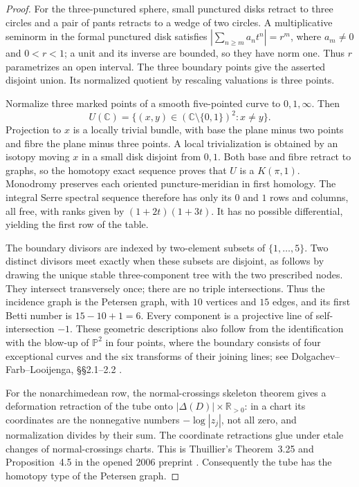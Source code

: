 \begin{proof}
For the three-punctured sphere, small punctured disks retract to three
circles and a pair of pants retracts to a wedge of two circles. A
multiplicative seminorm in the formal punctured disk satisfies
$|\sum_{n\geq m}a_nt^n|=r^m$, where $a_m\ne0$ and $0<r<1$; a unit and
its inverse are bounded, so they have norm one. Thus $r$ parametrizes an
open interval. The three boundary points give the asserted disjoint
union. Its normalized quotient by rescaling valuations is three points.

Normalize three marked points of a smooth five-pointed curve to
$0,1,\infty$. Then
\[
 U(\mathbb C)=\{(x,y)\in(\mathbb C\setminus\{0,1\})^2:x\ne y\}.
\]
Projection to $x$ is a locally trivial bundle, with base the plane minus
two points and fibre the plane minus three points. A local trivialization
is obtained by an isotopy moving $x$ in a small disk disjoint from $0,1$.
Both base and fibre retract to graphs, so the homotopy exact sequence
proves that $U$ is a $K(\pi,1)$. Monodromy preserves each oriented
puncture-meridian in first homology. The integral Serre spectral sequence
therefore has only its $0$ and $1$ rows and columns, all free, with ranks
given by $(1+2t)(1+3t)$. It has no possible differential, yielding the
first row of the table.

The boundary divisors are indexed by two-element subsets of
$\{1,\ldots,5\}$. Two distinct divisors meet exactly when these subsets
are disjoint, as follows by drawing the unique stable three-component
tree with the two prescribed nodes. They intersect transversely once;
there are no triple intersections. Thus the incidence graph is the
Petersen graph, with $10$ vertices and $15$ edges, and its first Betti
number is $15-10+1=6$. Every component is a projective line of
self-intersection $-1$. These geometric descriptions also follow from
the identification with the blow-up of $\mathbb P^2$ in four points,
where the boundary consists of four exceptional curves and the six
transforms of their joining lines; see Dolgachev--Farb--Looijenga,
\S\S2.1--2.2 \cite{DolgachevFarbLooijenga2018}.

For the nonarchimedean row, the normal-crossings skeleton theorem gives
a deformation retraction of the tube onto
$|\Delta(D)|\times\mathbb R_{>0}$: in a chart its coordinates are the
nonnegative numbers $-\log|z_j|$, not all zero, and normalization divides
by their sum. The coordinate retractions glue under etale changes of
normal-crossings charts. This is Thuillier's Theorem~3.25 and
Proposition~4.5 in the opened 2006 preprint \cite{Thuillier2006}.
Consequently the tube has the homotopy type of the Petersen graph.


\end{proof}
